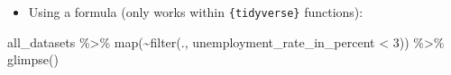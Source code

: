 \documentclass[
]{article}
\newenvironment{Shaded}{\begin{snugshade}}{\end{snugshade}}
\newcommand{\DecValTok}[1]{\textcolor[rgb]{0.00,0.00,0.81}{#1}}
\newcommand{\FunctionTok}[1]{\textcolor[rgb]{0.00,0.00,0.00}{#1}}
\newcommand{\NormalTok}[1]{#1}
\newcommand{\SpecialCharTok}[1]{\textcolor[rgb]{0.00,0.00,0.00}{#1}}
\providecommand{\tightlist}{%
  \setlength{\itemsep}{0pt}\setlength{\parskip}{0pt}}
\begin{document}
\begin{itemize}
\tightlist
\item
  Using a formula (only works within \texttt{\{tidyverse\}} functions):
\end{itemize}

\begin{Shaded}
\begin{Highlighting}[]
\NormalTok{all\_datasets }\SpecialCharTok{\%\textgreater{}\%}
  \FunctionTok{map}\NormalTok{(}\SpecialCharTok{\textasciitilde{}}\FunctionTok{filter}\NormalTok{(., unemployment\_rate\_in\_percent }\SpecialCharTok{\textless{}} \DecValTok{3}\NormalTok{)) }\SpecialCharTok{\%\textgreater{}\%} 
  \FunctionTok{glimpse}\NormalTok{()}
\end{Highlighting}
\end{Shaded}
\end{document}
